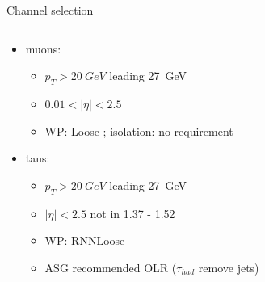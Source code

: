 \begin{frame}{Channel selection}
\begin{columns}
\begin{column}{0.7\textwidth}
\begin{itemize}
          \item muons:
          \vspace*{-0.02\textwidth}
          \begin{itemize}
            \footnotesize
            \item $p_T>\SI{20}{GeV}$ leading \SI{27}{GeV}
            \item $0.01<|\eta|<2.5$
            \item WP: Loose ; isolation: no requirement
          \end{itemize}
          \item taus:
          \vspace*{-0.02\textwidth}
          \begin{itemize}
            \footnotesize
            \item $p_T>\SI{20}{GeV}$ leading \SI{27}{GeV}
            \item $|\eta|<2.5$ not in 1.37 - 1.52
            \item WP: RNNLoose
            \item ASG recommended OLR ($\tau_{had}$ remove jets)
          \end{itemize}
        \end{itemize}
      \end{column}
    \end{columns}
  \end{frame}


